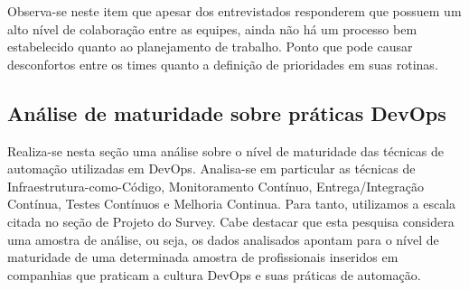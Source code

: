 \documentclass[twoside,english,brazilian]{UNISINOSartigo}
\begin{document}
Observa-se neste item que apesar dos entrevistados responderem que possuem um alto nível de colaboração entre as equipes, ainda não há um processo bem estabelecido quanto ao planejamento de trabalho. Ponto que pode causar desconfortos entre os times quanto a definição de prioridades em suas rotinas.

\subsection{Análise de maturidade sobre práticas DevOps}
Realiza-se nesta seção uma análise sobre o nível de maturidade das técnicas de automação utilizadas em DevOps. Analisa-se em particular as técnicas de Infraestrutura-como-Código, Monitoramento Contínuo, Entrega/Integração Contínua, Testes Contínuos e Melhoria Continua. Para tanto, utilizamos a escala citada no seção de Projeto do Survey.  Cabe destacar que esta pesquisa considera uma amostra de análise, ou seja, os dados analisados apontam para o nível de maturidade de uma determinada amostra de profissionais inseridos em companhias que praticam a cultura DevOps e suas práticas de automação.
\end{document}
